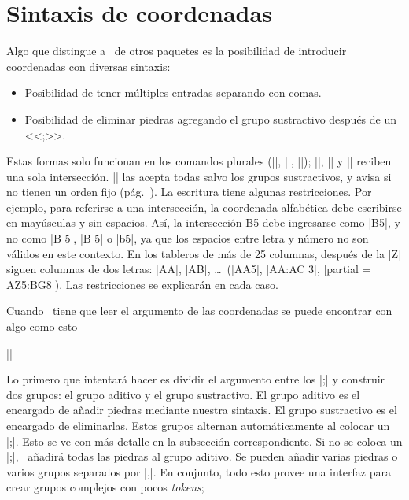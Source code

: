 \section{Sintaxis de coordenadas}
\label{subsec:sintaxis-de-coordenadas}

Algo que distingue a \pgfgoname\ de otros paquetes es la posibilidad de introducir coordenadas con diversas sintaxis:
\begin{itemize}
	\item Posibilidad de tener múltiples entradas separando con comas.
	\item Posibilidad de eliminar piedras agregando el grupo sustractivo despu\'es de un <<;>>.
\end{itemize}

Estas formas solo funcionan en los comandos plurales (|\stones|, |\marks|, |\prisoners|); |\stone|, |\mark| y |\prisoner| reciben una sola intersección. |\moves| las acepta todas salvo los grupos sustractivos, y avisa si no tienen un orden fijo (pág.~\pageref{subsec:orden-coordenadas}). La escritura tiene algunas restricciones. Por ejemplo, para referirse a una intersección, la coordenada alfabética debe escribirse en mayúsculas y sin espacios. Así, la intersección B5 debe ingresarse como |B5|, y no como |B 5|, |B  5| o |b5|, ya que los espacios entre letra y número no son válidos en este contexto. En los tableros de más de 25 columnas, después de la |Z| siguen columnas de dos letras: |AA|, |AB|, \dots\ (|AA5|, |AA:AC 3|, |partial = AZ5:BG8|). Las restricciones se explicarán en cada caso.


Cuando \pgfgoname\ tiene que leer el argumento de las coordenadas se puede encontrar con algo como esto
\begin{center}
	||
\end{center}

Lo primero que intentar\'a hacer es dividir el argumento entre los |;| y construir dos grupos: el grupo aditivo y el grupo sustractivo. El grupo aditivo es el encargado de a\~nadir piedras mediante nuestra sintaxis. El grupo sustractivo es el encargado de eliminarlas. Estos grupos alternan automáticamente al colocar un |;|. Esto se ve con m\'as detalle en la subsecci\'on correspondiente. Si no se coloca un |;|, \pgfgoname\ a\~nadir\'a todas las piedras al grupo aditivo. Se pueden a\~nadir varias piedras o varios grupos separados por |,|. En conjunto, todo esto provee una interfaz para crear grupos complejos con pocos \emph{tokens};

